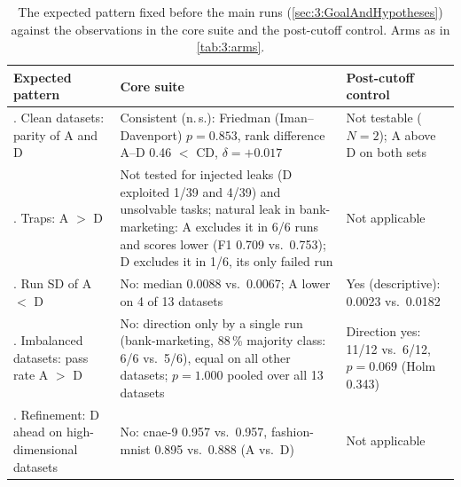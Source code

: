 \begin{table}[htbp]
  \centering
  \small
  \caption[Expected pattern and outcome]{The expected pattern fixed before the main runs (\autoref{sec:3:GoalAndHypotheses}) against the observations in the core suite and the post-cutoff control. Arms as in \autoref{tab:3:arms}.}
  \label{tab:6:expectations}
  \begin{tabularx}{\textwidth}{>{\RaggedRight\arraybackslash}p{3.2cm}LL}
    \toprule
    Expected pattern & Core suite & Post-cutoff control \\
    . Clean datasets: parity of A and D & Consistent (n.\,s.): Friedman (Iman--Davenport) $p = 0.853$, rank difference A--D 0.46 $<$ CD, $\delta = +0.017$ & Not testable ($N = 2$); A above D on both sets \\
    . Traps: A $>$ D & Not tested for injected leaks (D exploited 1/39 and 4/39) and unsolvable tasks; natural leak in bank-marketing: A excludes it in 6/6 runs and scores lower (F1 0.709 vs.\ 0.753); D excludes it in 1/6, its only failed run & Not applicable \\
    . Run SD of A $<$ D & No: median 0.0088 vs.\ 0.0067; A lower on 4 of 13 datasets & Yes (descriptive): 0.0023 vs.\ 0.0182 \\
    . Imbalanced datasets: pass rate A $>$ D & No: direction only by a single run (bank-marketing, 88\,\% majority class: 6/6 vs.\ 5/6), equal on all other datasets; $p = 1.000$ pooled over all 13 datasets & Direction yes: 11/12 vs.\ 6/12, \mbox{$p = 0.069$} (Holm 0.343) \\
    . Refinement: D ahead on high-dimensional datasets & No: cnae-9 0.957 vs.\ 0.957, fashion-mnist 0.895 vs.\ 0.888 (A vs.\ D) & Not applicable \\
    \bottomrule
  \end{tabularx}
\end{table}
